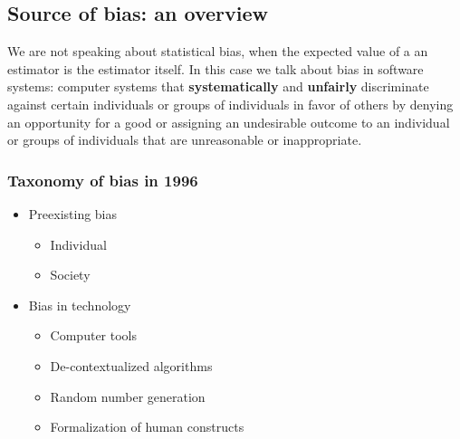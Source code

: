 \subsection{Source of bias: an overview}
We are not speaking about statistical bias, when the expected value of a an estimator is the estimator itself. In this case we talk about bias in software systems: computer systems that \textbf{systematically} and \textbf{unfairly} discriminate against certain individuals or groups of individuals in favor of others by denying an opportunity for a good or assigning an undesirable outcome to an individual or groups of individuals that are unreasonable or inappropriate.
\subsubsection{Taxonomy of bias in 1996}
\begin{itemize}
    \item Preexisting bias
    \begin{itemize}
        \item Individual
        \item Society 
    \end{itemize}
    \item Bias in technology
    \begin{itemize}
        \item Computer tools
        \item De-contextualized algorithms
        \item Random number generation
        \item Formalization of human constructs 
    \end{itemize}
\end{itemize}
